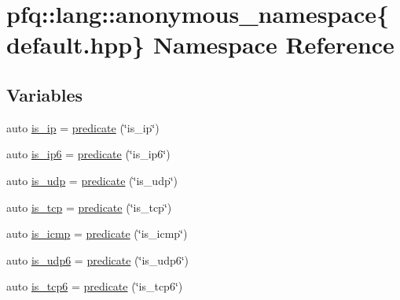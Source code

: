 \hypertarget{namespacepfq_1_1lang_1_1anonymous__namespace_02default_8hpp_03}{\section{pfq\+:\+:lang\+:\+:anonymous\+\_\+namespace\{default.\+hpp\} Namespace Reference}
\label{namespacepfq_1_1lang_1_1anonymous__namespace_02default_8hpp_03}
}
\subsection*{Variables}
\begin{DoxyCompactItemize}
\item 
auto \hyperlink{namespacepfq_1_1lang_1_1anonymous__namespace_02default_8hpp_03_aa97a34e12e4c6bc2d85a5c169800cfa4}{is\+\_\+ip} = \hyperlink{namespacepfq_1_1lang_a6c156f209614d0291b280153416dba97}{predicate} (\char`\"{}is\+\_\+ip\char`\"{})
\item 
auto \hyperlink{namespacepfq_1_1lang_1_1anonymous__namespace_02default_8hpp_03_a5fa35e94e399b76838b7be894d85b83c}{is\+\_\+ip6} = \hyperlink{namespacepfq_1_1lang_a6c156f209614d0291b280153416dba97}{predicate} (\char`\"{}is\+\_\+ip6\char`\"{})
\item 
auto \hyperlink{namespacepfq_1_1lang_1_1anonymous__namespace_02default_8hpp_03_a42701f36d9dde7f3636b90244d520a16}{is\+\_\+udp} = \hyperlink{namespacepfq_1_1lang_a6c156f209614d0291b280153416dba97}{predicate} (\char`\"{}is\+\_\+udp\char`\"{})
\item 
auto \hyperlink{namespacepfq_1_1lang_1_1anonymous__namespace_02default_8hpp_03_a67fe3072aa5353c1526aa04320d40137}{is\+\_\+tcp} = \hyperlink{namespacepfq_1_1lang_a6c156f209614d0291b280153416dba97}{predicate} (\char`\"{}is\+\_\+tcp\char`\"{})
\item 
auto \hyperlink{namespacepfq_1_1lang_1_1anonymous__namespace_02default_8hpp_03_a01ccba89c8582ba423393226b54f12de}{is\+\_\+icmp} = \hyperlink{namespacepfq_1_1lang_a6c156f209614d0291b280153416dba97}{predicate} (\char`\"{}is\+\_\+icmp\char`\"{})
\item 
auto \hyperlink{namespacepfq_1_1lang_1_1anonymous__namespace_02default_8hpp_03_a8f3f79760f7be2ce30db5025bff887a6}{is\+\_\+udp6} = \hyperlink{namespacepfq_1_1lang_a6c156f209614d0291b280153416dba97}{predicate} (\char`\"{}is\+\_\+udp6\char`\"{})
\item 
auto \hyperlink{namespacepfq_1_1lang_1_1anonymous__namespace_02default_8hpp_03_a56d9bafc51ca6775da4ec3b816b1c7bb}{is\+\_\+tcp6} = \hyperlink{namespacepfq_1_1lang_a6c156f209614d0291b280153416dba97}{predicate} (\char`\"{}is\+\_\+tcp6\char`\"{})

\end{DoxyCompactItemize}
